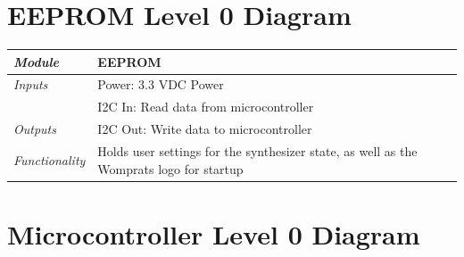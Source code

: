 \documentclass{article}
\begin{document}
\section{EEPROM Level 0 Diagram}

\begin{tabular}{|p{1in}|p{5in}|}
\hline
\emph{Module} & EEPROM \\
\hline
\emph{Inputs}& Power: 3.3 VDC Power\\
	     & I2C In: Read data from microcontroller \\
\hline
\emph{Outputs}& I2C Out: Write data to microcontroller \\ 
\hline
\emph{Functionality}& Holds user settings for the synthesizer state, as well as the Womprats logo for startup\\
\hline
\end{tabular}

\section{Microcontroller Level 0 Diagram}
\end{document}
